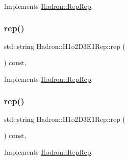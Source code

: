 Implements \mbox{\hyperlink{structHadron_1_1RepRep_ab3213025f6de249f7095892109575fde}{Hadron\+::\+Rep\+Rep}}.

\mbox{\label{structHadron_1_1H1o2D3E1Rep_a06bc9c58f069a4734422133269965d64}} 
\subsubsection{\texorpdfstring{rep()}{rep()}\hspace{0.1cm}{\footnotesize\ttfamily [2/5]}}
{\footnotesize\ttfamily std\+::string Hadron\+::\+H1o2\+D3\+E1\+Rep\+::rep (\begin{DoxyParamCaption}{ }\end{DoxyParamCaption}) const\hspace{0.3cm}{\ttfamily [inline]}, {\ttfamily [virtual]}}



Implements \mbox{\hyperlink{structHadron_1_1RepRep_ab3213025f6de249f7095892109575fde}{Hadron\+::\+Rep\+Rep}}.

\mbox{\label{structHadron_1_1H1o2D3E1Rep_a06bc9c58f069a4734422133269965d64}} 
\subsubsection{\texorpdfstring{rep()}{rep()}\hspace{0.1cm}{\footnotesize\ttfamily [3/5]}}
{\footnotesize\ttfamily std\+::string Hadron\+::\+H1o2\+D3\+E1\+Rep\+::rep (\begin{DoxyParamCaption}{ }\end{DoxyParamCaption}) const\hspace{0.3cm}{\ttfamily [inline]}, {\ttfamily [virtual]}}



Implements \mbox{\hyperlink{structHadron_1_1RepRep_ab3213025f6de249f7095892109575fde}{Hadron\+::\+Rep\+Rep}}.

\mbox{\label{structHadron_1_1H1o2D3E1Rep_a06bc9c58f069a4734422133269965d64}} 
